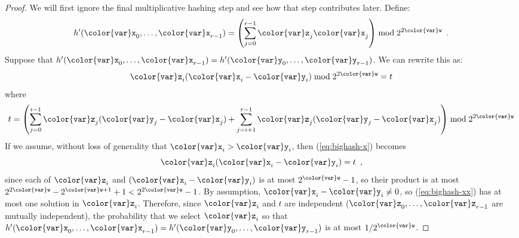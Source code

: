 \documentclass[10pt]{book}
\newcommand{\eqlabel}[1]{\label{eq:#1}}
\newcommand{\myeqref}[1]{(\ref{eq:#1})}
\theoremstyle{plain}
\theoremstyle{definition}
\begin{document}
\begin{proof}
  We will first ignore the final multiplicative hashing step and see how
  that step contributes later.  Define:
  \[
    h'(\ensuremath{\mathtt{{\color{var}x}}}_0,\ldots,\ensuremath{\mathtt{{\color{var}x}}}_{r-1}) =  
       \left(\sum_{j=0}^{r-1} \ensuremath{\mathtt{{\color{var}z}}}_j \ensuremath{\mathtt{{\color{var}x}}}_j\right)\bmod 2^{2\ensuremath{\mathtt{{\color{var}w}}}} \enspace .
  \]
  Suppose that $h'(\ensuremath{\mathtt{{\color{var}x}}}_0,\ldots,\ensuremath{\mathtt{{\color{var}x}}}_{r-1}) =  h'(\ensuremath{\mathtt{{\color{var}y}}}_0,\ldots,\ensuremath{\mathtt{{\color{var}y}}}_{r-1})$.
  We can rewrite this as:
  \begin{equation}  \eqlabel{bighash-x}
      \ensuremath{\mathtt{{\color{var}z}}}_i(\ensuremath{\mathtt{{\color{var}x}}}_i-\ensuremath{\mathtt{{\color{var}y}}}_i) \bmod 2^{2\ensuremath{\mathtt{{\color{var}w}}}} = t
  \end{equation}
  where 
  \[
     t = \left(\sum_{j=0}^{i-1} \ensuremath{\mathtt{{\color{var}z}}}_j(\ensuremath{\mathtt{{\color{var}y}}}_j-\ensuremath{\mathtt{{\color{var}x}}}_j) + \sum_{j=i+1}^{r-1} \ensuremath{\mathtt{{\color{var}z}}}_j(\ensuremath{\mathtt{{\color{var}y}}}_j-\ensuremath{\mathtt{{\color{var}x}}}_j)\right) \bmod 2^{2\ensuremath{\mathtt{{\color{var}w}}}}
  \]
  If we assume, without loss of generality that $\ensuremath{\mathtt{{\color{var}x}}}_i> \ensuremath{\mathtt{{\color{var}y}}}_i$, then
  \myeqref{bighash-x} becomes
  \begin{equation}
      \ensuremath{\mathtt{{\color{var}z}}}_i(\ensuremath{\mathtt{{\color{var}x}}}_i-\ensuremath{\mathtt{{\color{var}y}}}_i) = t \eqlabel{bighash-xx} \enspace ,
  \end{equation}
  since each of $\ensuremath{\mathtt{{\color{var}z}}}_i$ and $(\ensuremath{\mathtt{{\color{var}x}}}_i-\ensuremath{\mathtt{{\color{var}y}}}_i)$ is at most $2^{\ensuremath{\mathtt{{\color{var}w}}}}-1$, so
  their product is at most $2^{2\ensuremath{\mathtt{{\color{var}w}}}}-2^{\ensuremath{\mathtt{{\color{var}w}}}+1}+1 < 2^{2\ensuremath{\mathtt{{\color{var}w}}}}-1$.
  By assumption, $\ensuremath{\mathtt{{\color{var}x}}}_i-\ensuremath{\mathtt{{\color{var}y}}}_i\neq 0$, so \myeqref{bighash-xx} has at most one
  solution in $\ensuremath{\mathtt{{\color{var}z}}}_i$.  Therefore, since $\ensuremath{\mathtt{{\color{var}z}}}_i$ and $t$ are
  independent ($\ensuremath{\mathtt{{\color{var}z}}}_0,\ldots,\ensuremath{\mathtt{{\color{var}z}}}_{r-1}$ are mutually independent), the
  probability that we select $\ensuremath{\mathtt{{\color{var}z}}}_i$
  so that $h'(\ensuremath{\mathtt{{\color{var}x}}}_0,\ldots,\ensuremath{\mathtt{{\color{var}x}}}_{r-1})=h'(\ensuremath{\mathtt{{\color{var}y}}}_0,\ldots,\ensuremath{\mathtt{{\color{var}y}}}_{r-1})$ is at most
  $1/2^{\ensuremath{\mathtt{{\color{var}w}}}}$.


\end{proof}
\end{document}
